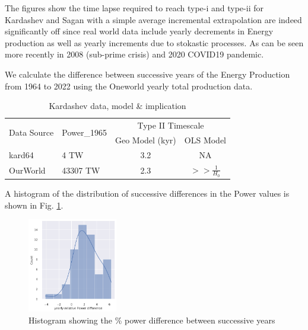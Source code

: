 \documentclass[final,5p,times,twocolumn,authoryear]{elsarticle}
\begin{document}
The figures show the time lapse required to reach type-i and type-ii for Kardashev and Sagan with a simple average incremental extrapolation are indeed significantly off since real world data include yearly decrements in Energy production as well as yearly increments due to stokastic processes. As can be seen more recently in 2008 (sub-prime crisis) and 2020 COVID19 pandemic.

We calculate the difference between successive years of the Energy Production from 1964 to 2022 using the Oneworld yearly total production data. 


\begin{table}[h]
\centering
\caption{Kardashev data, model \& implication}
\label{kard_comp}
\begin{tabular}{|l|l|c|c|}
\hline
\multirow{2}{*}{Data Source} & \multirow{2}{*}{\textrm{Power_{1965}}} & \multicolumn{2}{c|}{Type II Timescale} \\
\cline{3-4}
                             &                       & Geo Model (kyr) & OLS Model         \\
\hline
kard64 \cite{kar64} & 4 TW                & 3.2             & NA          \\
\hline
OurWorld \cite{owidenergy}    & 43307 TW               & 2.3             & $>> \frac{1}{H_{0}}$     \\
\hline
\end{tabular}
\end{table}


A histogram of the distribution of successive differences in the Power values is shown in Fig. \ref{fig:his_power}. 

\begin{figure}
    \centering
    \includegraphics[width=0.35\textwidth]{figs/pp_his_kdetrue.png}
    \vspace*{-0.3cm}
    \caption{Histogram showing the \% power difference between successive years}
    \label{fig:his_power}
\end{figure}
\end{document}
